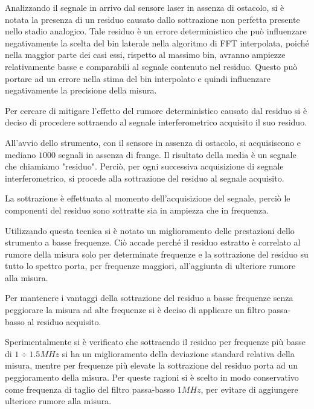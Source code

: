Analizzando il segnale in arrivo dal sensore laser in assenza di ostacolo, si è notata la presenza di un residuo causato dallo sottrazione non perfetta presente nello stadio analogico. Tale residuo è un errore deterministico che può influenzare negativamente la scelta del bin laterale nella algoritmo di FFT interpolata, poiché nella maggior parte dei casi essi, rispetto al massimo bin, avranno ampiezze relativamente basse e comparabili al segnale contenuto nel residuo. Questo può portare ad un errore nella stima del bin interpolato e quindi influenzare negativamente la precisione della misura.

Per cercare di mitigare l'effetto del rumore deterministico causato dal residuo si è deciso di procedere sottraendo al segnale interferometrico acquisito il suo residuo.

All'avvio dello strumento, con il sensore in assenza di ostacolo, si acquisiscono e mediano $1000$ segnali in assenza di frange. Il risultato della media è un segnale che chiamiamo "residuo". Perciò, per ogni successiva acquisizione di segnale interferometrico, si procede alla sottrazione del residuo al segnale acquisito.

La sottrazione è effettuata al momento dell'acquisizione del segnale, perciò le componenti del residuo sono sottratte sia in ampiezza che in frequenza. 

Utilizzando questa tecnica si è notato un miglioramento delle prestazioni dello strumento a basse frequenze. Ciò accade perché il residuo estratto è correlato al rumore della misura solo per determinate frequenze e la sottrazione del residuo su tutto lo spettro porta, per frequenze maggiori, all'aggiunta di ulteriore rumore alla misura.

Per mantenere i vantaggi della sottrazione del residuo a basse frequenze senza peggiorare la misura ad alte frequenze si è deciso di applicare un filtro passa-basso al residuo acquisito.

Sperimentalmente si è verificato che sottraendo il residuo per frequenze più basse di $1 \div 1.5MHz$ si ha un miglioramento della deviazione standard relativa della misura, mentre per frequenze più elevate la sottrazione del residuo porta ad un peggioramento della misura.
Per queste ragioni si è scelto in modo conservativo come frequenza di taglio del filtro passa-basso $1MHz$, per evitare di aggiungere ulteriore rumore alla misura.


